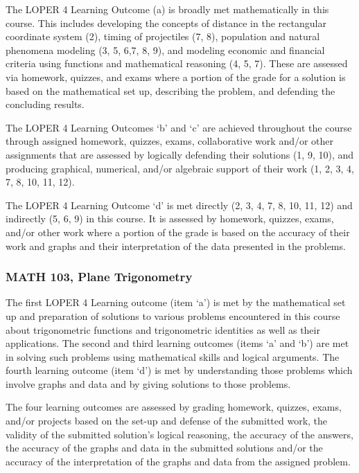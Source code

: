 \documentclass[11pt]{article}
\begin{document}
The LOPER 4 Learning Outcome (a) is broadly met mathematically 
in this course.  This includes developing the concepts of distance 
in the rectangular coordinate system (2), timing of projectiles (7, 8),  
population and natural phenomena modeling (3, 5, 6,7, 8, 9), and modeling 
economic and financial criteria using functions and mathematical reasoning (4, 5, 7).  
These are assessed via homework, quizzes, and exams where a portion of the grade 
for a solution is based on the mathematical set up, describing the problem, and 
defending the concluding results. 

The LOPER 4 Learning 
Outcomes `b' and `c' are achieved throughout the course through assigned homework, 
quizzes, exams, collaborative work and/or other assignments that are assessed by 
logically defending their solutions (1, 9, 10), and producing graphical, numerical, 
and/or algebraic support of their work (1, 2, 3, 4, 7, 8, 10, 11, 12).  

 The LOPER 4 Learning 
Outcome `d' is met directly (2, 3, 4, 7, 8, 10, 11, 12) and indirectly (5, 6, 9) 
in this course.  It is assessed by homework, quizzes, exams, and/or other work where 
a portion of the grade is based on the accuracy of their work and graphs and their 
interpretation of the data presented in the problems. 

\subsubsection{MATH 103, Plane Trigonometry} 
The first LOPER 4 Learning outcome (item `a') is met by 
the mathematical set up and preparation of solutions to various problems 
encountered in this course about trigonometric functions and 
trigonometric identities as well as their applications. The second 
and third learning outcomes (items `a' and `b') are met in solving 
such problems using 
mathematical skills and logical arguments. The fourth learning 
outcome (item `d') is met by understanding those problems which involve graphs 
and data and by giving solutions to those problems. 

The four learning 
outcomes are assessed by grading homework, quizzes, exams, and/or 
projects based on the set-up and defense of the submitted work, 
the validity of the submitted solution's logical reasoning, the 
accuracy of the answers, the accuracy of the graphs and data in the 
submitted solutions and/or the accuracy of the interpretation of the 
graphs and data from the assigned problem. 
\end{document}
